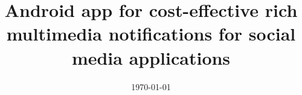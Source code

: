 \documentclass[a4paper, 11pt, twoside, openright]{Thesis}  %
\numberwithin{algorithm}{chapter}
\begin{document}
\frontmatter	  %

\title  {Android app for cost-effective rich multimedia notifications for social media applications}
\addresses  {\groupname\\\deptname\\\univname}  %
\date       {\today}
\subject    {}
\keywords   {}

\maketitle






  
 
\end{document}
